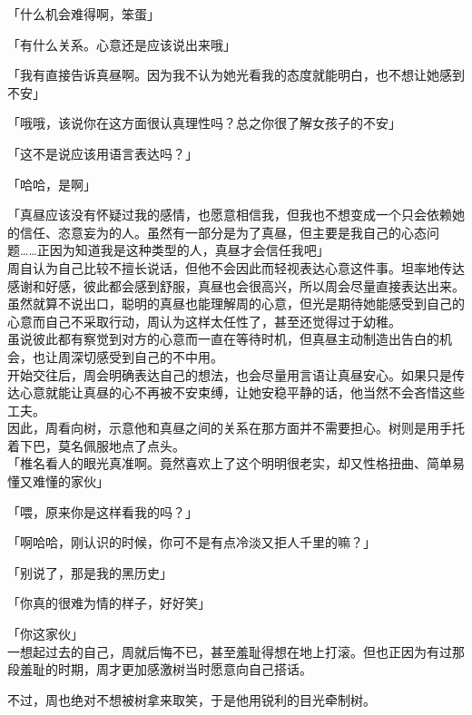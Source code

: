 「什么机会难得啊，笨蛋」

「有什么关系。心意还是应该说出来哦」

「我有直接告诉真昼啊。因为我不认为她光看我的态度就能明白，也不想让她感到不安」

「哦哦，该说你在这方面很认真理性吗？总之你很了解女孩子的不安」

「这不是说应该用语言表达吗？」

「哈哈，是啊」

「真昼应该没有怀疑过我的感情，也愿意相信我，但我也不想变成一个只会依赖她的信任、恣意妄为的人。虽然有一部分是为了真昼，但主要是我自己的心态问题……正因为知道我是这种类型的人，真昼才会信任我吧」\\

周自认为自己比较不擅长说话，但他不会因此而轻视表达心意这件事。坦率地传达感谢和好感，彼此都会感到舒服，真昼也会很高兴，所以周会尽量直接表达出来。\\

虽然就算不说出口，聪明的真昼也能理解周的心意，但光是期待她能感受到自己的心意而自己不采取行动，周认为这样太任性了，甚至还觉得过于幼稚。\\

虽说彼此都有察觉到对方的心意而一直在等待时机，但真昼主动制造出告白的机会，也让周深切感受到自己的不中用。\\

开始交往后，周会明确表达自己的想法，也会尽量用言语让真昼安心。如果只是传达心意就能让真昼的心不再被不安束缚，让她安稳平静的话，他当然不会吝惜这些工夫。\\

因此，周看向树，示意他和真昼之间的关系在那方面并不需要担心。树则是用手托着下巴，莫名佩服地点了点头。\\

「椎名看人的眼光真准啊。竟然喜欢上了这个明明很老实，却又性格扭曲、简单易懂又难懂的家伙」

「喂，原来你是这样看我的吗？」

「啊哈哈，刚认识的时候，你可不是有点冷淡又拒人千里的嘛？」

「别说了，那是我的黑历史」

「你真的很难为情的样子，好好笑」

「你这家伙」\\

一想起过去的自己，周就后悔不已，甚至羞耻得想在地上打滚。但也正因为有过那段羞耻的时期，周才更加感激树当时愿意向自己搭话。

不过，周也绝对不想被树拿来取笑，于是他用锐利的目光牵制树。\\


